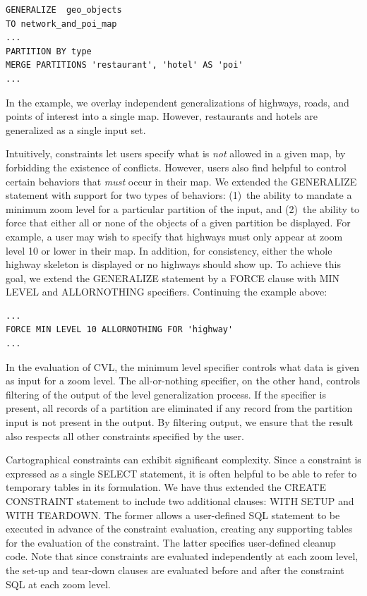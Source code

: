 \begin{lstlisting}
GENERALIZE  geo_objects
TO network_and_poi_map
...
PARTITION BY type
MERGE PARTITIONS 'restaurant', 'hotel' AS 'poi'
... 
\end{lstlisting}

In the example, we overlay independent generalizations of highways, roads, and points of interest into a single map. However, restaurants and hotels are generalized as a single input set.  

Intuitively, constraints let users specify what is \emph{not} allowed in a given map, by forbidding the existence of conflicts. However, users also find helpful to control certain behaviors that \emph{must} occur in their map. We extended the GENERALIZE statement with support for two types of behaviors: (1)~the ability to mandate a minimum zoom level for a particular partition of the input, and (2)~the ability to force that either all or none of the objects of a given partition be displayed. For example, a user may wish to specify that highways must only appear at zoom level 10 or lower in their map. In addition, for consistency, either the whole highway skeleton is displayed or no highways should show up. To achieve this goal, we extend the GENERALIZE statement by a FORCE clause with MIN LEVEL and ALLORNOTHING specifiers. Continuing the example above:

\begin{lstlisting}
...
FORCE MIN LEVEL 10 ALLORNOTHING FOR 'highway'
... 
\end{lstlisting}

In the evaluation of CVL, the minimum level specifier controls what data is given as input for a zoom level. The all-or-nothing specifier, on the other hand, controls filtering of the output of the level generalization process. If the specifier is present, all records of a partition are eliminated if any record from the partition input is not present in the output. By filtering output, we ensure that the result also respects all other constraints specified by the user. 

Cartographical constraints can exhibit significant complexity. Since a constraint is expressed as a single SELECT statement, it is often helpful to be able to refer to temporary tables in its formulation. We have thus extended the CREATE CONSTRAINT statement to include two additional clauses: WITH SETUP and WITH TEARDOWN. The former allows a user-defined SQL statement to be executed in advance of the constraint evaluation, creating any supporting tables for the evaluation of the constraint. The latter specifies user-defined cleanup code. Note that since constraints are evaluated independently at each zoom level, the set-up and tear-down clauses are evaluated before and after the constraint SQL at each zoom level.       

%
%

